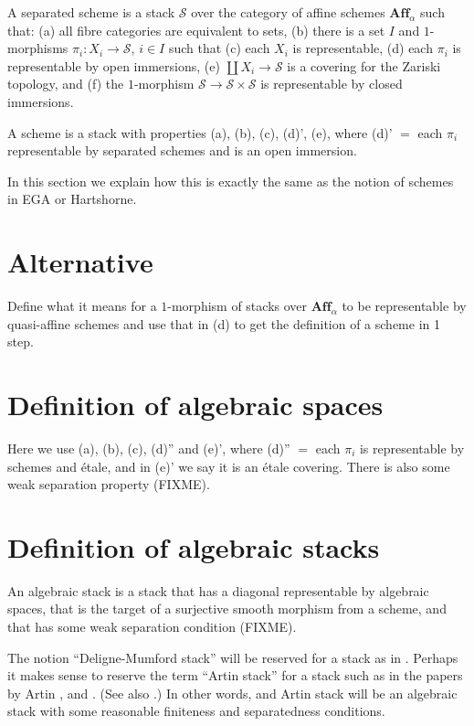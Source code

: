 \noindent
A separated scheme is a stack $\mathcal{S}$ over the category of affine
schemes $\mathbf{Aff}_\alpha$ such that: (a) all fibre categories are
equivalent to sets, (b) there is a set $I$ and $1$-morphisms
$\pi_i : X_i \to \mathcal{S}$, $i\in I$ such that (c) each $X_i$ is
representable, (d) each $\pi_i$ is representable by open immersions,
(e) $\coprod X_i \to \mathcal{S}$ is a covering for the Zariski topology,
and (f) the $1$-morphism $\mathcal{S} \to \mathcal{S}\times \mathcal{S}$ is
representable by closed immersions.

\medskip\noindent
A scheme is a stack with properties (a), (b), (c), (d)', (e), where
(d)' $ = $ each $\pi_i$ representable by separated schemes and is an open
immersion.

\medskip\noindent
In this section we explain how this is exactly the same as the notion of
schemes in EGA or Hartshorne.

\section{Alternative}
\label{section-schemes-alternative}

\noindent
Define what it means for a $1$-morphism of stacks over $\textbf{Aff}_\alpha$
to be representable by quasi-affine schemes and use that in (d) to get the
definition of a scheme in 1 step.

\section{Definition of algebraic spaces}
\label{section-definition-algebraic-spaces}

\noindent
Here we use (a), (b), (c), (d)'' and (e)', where
(d)'' $ = $ each $\pi_i$ is representable by schemes and \'etale, and
in (e)' we say it is an \'etale covering. There is also some weak
separation property (FIXME).

\section{Definition of algebraic stacks}
\label{section-definition-algebraic-stacks}

\noindent
An algebraic stack is a stack that has a diagonal representable by algebraic
spaces, that is the target of a surjective smooth morphism from a scheme,
and that has some weak separation condition (FIXME).

\medskip\noindent
The notion ``Deligne-Mumford stack'' will be reserved for a stack as in
\cite{DM}. Perhaps it makes sense to reserve the term ``Artin stack'' for
a stack such as in the papers by Artin \cite{ArtinI}, and \cite{ArtinVersal}.
(See also \cite{ConradeJong}.) In other words, and Artin stack will be an
algebraic stack with some reasonable finiteness and separatedness conditions.

